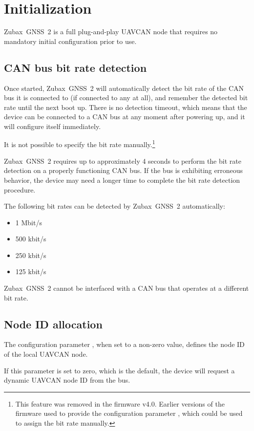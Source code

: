 \documentclass{zubaxdoc}
\begin{document}
\section{Initialization}

Zubax~GNSS~2 is a full plug-and-play UAVCAN node that requires no mandatory initial configuration prior to use.

\subsection{CAN bus bit rate detection}

Once started, Zubax~GNSS~2 will automatically detect the bit rate of the CAN bus it is connected to
(if connected to any at all), and remember the detected bit rate until the next boot up.
There is no detection timeout, which means that the device can be connected to a CAN bus at
any moment after powering up, and it will configure itself immediately.

It is not possible to specify the bit rate manually.\footnote{This feature was removed in the firmware v4.0.
Earlier versions of the firmware used to provide the configuration parameter
, which could be used to assign the bit rate manually.}

Zubax~GNSS~2 requires up to approximately 4 seconds to perform the bit rate detection on a properly
functioning CAN bus.
If the bus is exhibiting erroneous behavior, the device may need a longer time to complete the bit rate
detection procedure.

The following bit rates can be detected by Zubax~GNSS~2 automatically:
\begin{itemize}
\item 1 Mbit/s
\item 500 kbit/s
\item 250 kbit/s
\item 125 kbit/s
\end{itemize}
Zubax~GNSS~2 cannot be interfaced with a CAN bus that operates at a different bit rate.

\subsection{Node ID allocation}

The configuration parameter , when set to a non-zero value,
defines the node ID of the local UAVCAN node.

If this parameter is set to zero, which is the default, the device will request a dynamic UAVCAN node ID
from the bus.
\end{document}
